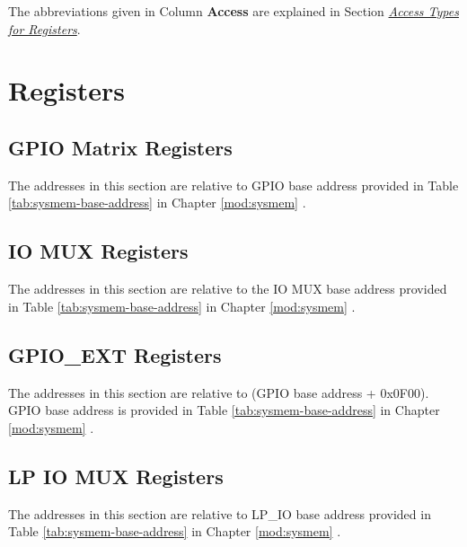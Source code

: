 \documentclass[main\_\_EN.tex]{subfiles}
\begin{document}
The abbreviations given in Column \textbf{Access} are explained in Section \hyperref[glossary-access-types]{\textit{Access Types for Registers}}.



\section{Registers}

\subsection{GPIO Matrix Registers}
The addresses in this section are relative to GPIO base address provided in Table \ref{tab:sysmem-base-address} in Chapter \ref{mod:sysmem} \textit{}.


\subsection{IO MUX Registers}
The addresses in this section are relative to the IO MUX base address provided in Table \ref{tab:sysmem-base-address} in Chapter \ref{mod:sysmem} \textit{}.


\subsection{GPIO\_EXT Registers}



The addresses in this section are relative to (GPIO base address + 0x0F00). GPIO base address is provided in Table \ref{tab:sysmem-base-address} in Chapter \ref{mod:sysmem} \textit{}.


\subsection{LP IO MUX Registers}
The addresses in this section are relative to LP\_IO base address provided in Table \ref{tab:sysmem-base-address} in Chapter \ref{mod:sysmem} \textit{}.

\end{document}
